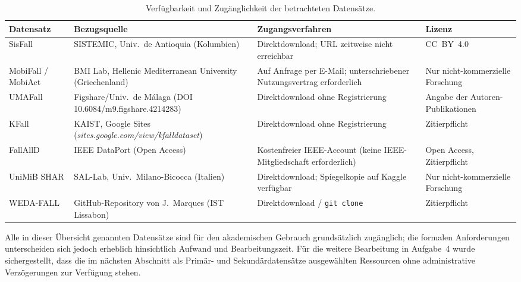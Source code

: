 \documentclass[11pt,a4paper,oneside]{report}
\begin{document}
\begin{table}[H]
\centering
\caption{Verfügbarkeit und Zugänglichkeit der betrachteten Datensätze.}
\label{tab:availability}
\footnotesize
\setlength{\tabcolsep}{3pt}
\renewcommand{\arraystretch}{1.2}
\begin{tabularx}{\textwidth}{
>{\raggedright\arraybackslash}p{1.7cm}
>{\raggedright\arraybackslash}X
>{\raggedright\arraybackslash}p{3.0cm}
>{\raggedright\arraybackslash}p{2.4cm}
}
\toprule
\textbf{Datensatz} &
\textbf{Bezugsquelle} &
\textbf{Zugangsverfahren} &
\textbf{Lizenz} \\
\midrule

SisFall
& SISTEMIC, Univ.\ de Antioquia (Kolumbien)
& Direktdownload; URL zeitweise nicht erreichbar
& CC~BY~4.0 \\

MobiFall / MobiAct
& BMI Lab, Hellenic Mediterranean University (Griechenland)
& Auf Anfrage per E-Mail; unterschriebener Nutzungsvertrag erforderlich
& Nur nicht-kommerzielle Forschung \\

UMAFall
& Figshare\slash Univ.\ de Málaga (DOI 10.6084/m9.figshare.4214283)
& Direktdownload ohne Registrierung
& Angabe der Autoren-Publikationen \\

KFall
& KAIST, Google Sites (\emph{sites.google.com/view/kfalldataset})
& Direktdownload ohne Registrierung
& Zitierpflicht \\

FallAllD
& IEEE DataPort (Open Access)
& Kostenfreier IEEE-Account (keine IEEE-Mitgliedschaft erforderlich)
& Open Access, Zitierpflicht \\

UniMiB SHAR
& SAL-Lab, Univ.\ Milano-Bicocca (Italien)
& Direktdownload; Spiegelkopie auf Kaggle verfügbar
& Nur nicht-kommerzielle Forschung \\

WEDA-FALL
& GitHub-Repository von J.~Marques (IST Lissabon)
& Direktdownload / \texttt{git clone}
& Zitierpflicht \\

\bottomrule
\end{tabularx}
\end{table}

Alle in dieser Übersicht genannten Datensätze sind für den akademischen
Gebrauch grundsätzlich zugänglich; die formalen Anforderungen
unterscheiden sich jedoch erheblich hinsichtlich Aufwand und
Bearbeitungszeit. Für die weitere Bearbeitung in Aufgabe~4 wurde
sichergestellt, dass die im nächsten Abschnitt als Primär- und
Sekundärdatensätze ausgewählten Ressourcen ohne administrative
Verzögerungen zur Verfügung stehen.
\end{document}
